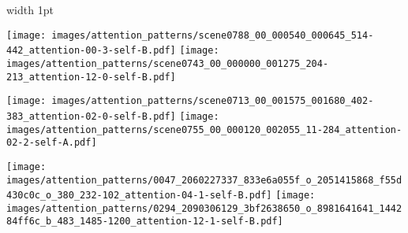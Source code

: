 \documentclass[10pt,twocolumn,letterpaper]{article}
\renewcommand{\*}[1]{\mathbf{#1}}
\newcommand{\0}{\phantom{0}}
\begin{document}
\begin{figure*}[ht!]
\vspace{3mm}
\def\iwidth{0.49}
\begin{minipage}{0.02\textwidth}
\end{minipage}\hfill{\vline width 1pt}\hfill
\hspace{1mm}\begin{minipage}{0.32\textwidth}
    \texttt{[image: images/attention\_patterns/scene0788\_00\_000540\_000645\_514-442\_attention-00-3-self-B.pdf]}
    \texttt{[image: images/attention\_patterns/scene0743\_00\_000000\_001275\_204-213\_attention-12-0-self-B.pdf]}
\end{minipage}\hspace{1mm}\begin{minipage}{0.32\textwidth}
    \texttt{[image: images/attention\_patterns/scene0713\_00\_001575\_001680\_402-383\_attention-02-0-self-B.pdf]}
    \texttt{[image: images/attention\_patterns/scene0755\_00\_000120\_002055\_11-284\_attention-02-2-self-A.pdf]}
\end{minipage}\hspace{1mm}\begin{minipage}[c]{0.32\textwidth}
    \texttt{[image: images/attention\_patterns/0047\_2060227337\_833e6a055f\_o\_2051415868\_f55d430c0c\_o\_380\_232-102\_attention-04-1-self-B.pdf]}
    \texttt{[image: images/attention\_patterns/0294\_2090306129\_3bf2638650\_o\_8981641641\_144284ff6c\_b\_483\_1485-1200\_attention-12-1-self-B.pdf]}
\end{minipage}


\end{figure*}
\end{document}
